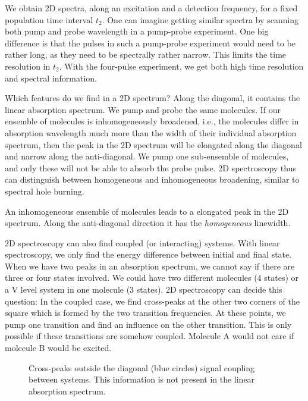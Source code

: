 We obtain 2D spectra, along an excitation and a detection frequency, for a fixed population time interval $t_2$. One can imagine getting similar spectra by scanning both pump and probe wavelength in a pump-probe experiment. One big difference is that the pulses in such a pump-probe experiment would need to be rather long, as they need to be spectrally rather narrow. This limits the time resolution in $t_2$. With the four-pulse experiment, we get both high time resolution and spectral information.

Which features do we find in a 2D spectrum? Along the diagonal, it contains the linear absorption spectrum. We pump and probe the same molecules. If our ensemble of molecules is inhomogeneously broadened, i.e., the molecules differ in absorption wavelength much more than the width of their individual absorption spectrum, then the peak in the 2D spectrum will be elongated along the diagonal and narrow along the anti-diagonal. We pump one sub-ensemble of molecules, and only these will not be able to absorb the probe pulse. 2D spectroscopy thus can distinguish between homogeneous and inhomogeneous broadening, similar to spectral hole burning.


\begin{marginfigure}

\caption{An inhomogeneous ensemble of molecules leads to a elongated peak in the 2D spectrum. Along the anti-diagonal direction it has the \emph{homogeneous} linewidth.}
\label{fig:2d_inhom_broadening}
\end{marginfigure}



2D spectroscopy can also find coupled (or interacting) systems. With linear spectroscopy, we only find the energy difference between initial and final state. When we have two peaks in an absorption spectrum, we cannot say if there are three or four states involved. We could have two  different molecules (4 states) or a V level system in one molecule (3 states). 2D spectroscopy can decide this question: In the coupled case, we find cross-peaks at the  other two corners  of the square which is formed by the two transition frequencies. At these points, we pump one transition and find an influence on the other transition. This is only possible if these transitions are somehow coupled. Molecule A would not care if molecule B would be excited.

\begin{figure}

\caption{Cross-peaks outside the diagonal (blue circles) signal coupling between systems. This information is not present in the linear absorption spectrum.}
\label{fig_2d_crosspeak}
\end{figure}


